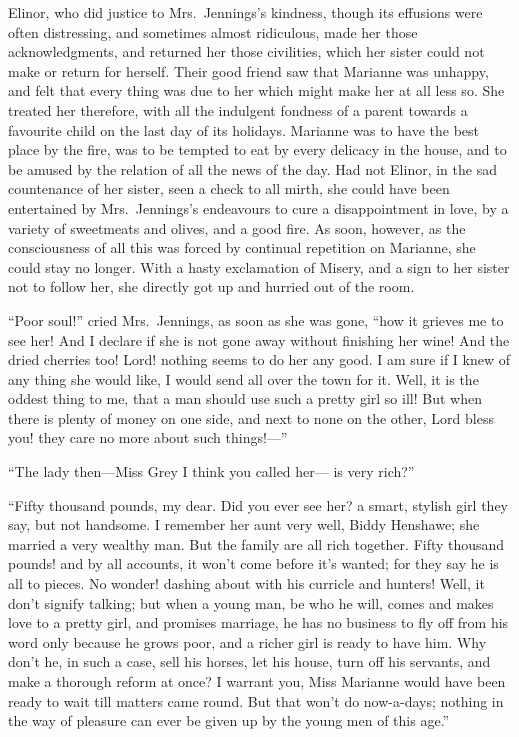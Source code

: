 Elinor, who did justice to Mrs.\ Jennings's kindness,
though its effusions were often distressing, and sometimes
almost ridiculous, made her those acknowledgments,
and returned her those civilities, which her sister could
not make or return for herself.  Their good friend saw
that Marianne was unhappy, and felt that every thing
was due to her which might make her at all less so.
She treated her therefore, with all the indulgent fondness
of a parent towards a favourite child on the last day of
its holidays.  Marianne was to have the best place by the fire,
was to be tempted to eat by every delicacy in the house,
and to be amused by the relation of all the news of the day.
Had not Elinor, in the sad countenance of her sister,
seen a check to all mirth, she could have been entertained
by Mrs.\ Jennings's endeavours to cure a disappointment in love,
by a variety of sweetmeats and olives, and a good fire.
As soon, however, as the consciousness of all this was
forced by continual repetition on Marianne, she could
stay no longer.  With a hasty exclamation of Misery,
and a sign to her sister not to follow her, she directly got
up and hurried out of the room.

``Poor soul!'' cried Mrs.\ Jennings, as soon as she was gone,
``how it grieves me to see her!  And I declare if she is
not gone away without finishing her wine!  And the dried
cherries too!  Lord! nothing seems to do her any good.
I am sure if I knew of any thing she would like, I would
send all over the town for it.  Well, it is the oddest
thing to me, that a man should use such a pretty girl
so ill!  But when there is plenty of money on one side,
and next to none on the other, Lord bless you! they care
no more about such things!---''

``The lady then---Miss Grey I think you called her---%
is very rich?''

``Fifty thousand pounds, my dear.  Did you ever see
her? a smart, stylish girl they say, but not handsome.
I remember her aunt very well, Biddy Henshawe; she married
a very wealthy man.  But the family are all rich together.
Fifty thousand pounds! and by all accounts, it won't come
before it's wanted; for they say he is all to pieces.
No wonder! dashing about with his curricle and hunters!
Well, it don't signify talking; but when a young man,
be who he will, comes and makes love to a pretty girl,
and promises marriage, he has no business to fly off
from his word only because he grows poor, and a richer
girl is ready to have him.  Why don't he, in such a case,
sell his horses, let his house, turn off his servants,
and make a thorough reform at once? I warrant you,
Miss Marianne would have been ready to wait till matters
came round.  But that won't do now-a-days; nothing in the
way of pleasure can ever be given up by the young men of
this age.''


